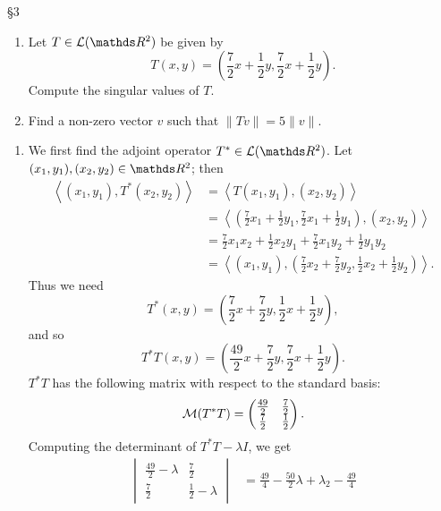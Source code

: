 \documentclass{homework}
\begin{document}
\begin{problem}{\S 3}
  \begin{enumerate}[label=(\alph*)]
    \item 
      Let $T\in \mc{L}(\R^2)$ be given by \[
        T(x,y)=(\frac{7}{2}x+\frac{1}{2}y, \frac{7}{2}x+\frac{1}{2}y)
      .\] Compute the singular values of $T$.
    \item Find a non-zero vector $v$ such that $\|Tv\|=5\|v\|$.
  \end{enumerate}
\end{problem}
\begin{solution}
  \begin{enumerate}[label=(\alph*)]
    \item 
  We first find the adjoint operator $T^*\in \mc{L}(\R^2)$. Let $(x_1,y_1),(x_2,y_2)\in \R^2$; then
  \begin{align*}
    \left<(x_1,y_1),T^*(x_2,y_2) \right> &= \left<T(x_1,y_1),(x_2,y_2) \right>  \\
                                         &= \left< (\frac{7}{2}x_1+\frac{1}{2}y_1,
                                         \frac{7}{2}x_1+\frac{1}{2}y_1), (x_2,y_2)\right>  \\
                                         &=
                                         \frac{7}{2}x_1x_2+\frac{1}{2}x_2y_1+\frac{7}{2}x_1y_2+\frac{1}{2}y_1y_2 \\
                                         &=
                                         \left<(x_1,y_1),(\frac{7}{2}x_2+\frac{7}{2}y_2,\frac{1}{2}x_2+\frac{1}{2}y_2) \right> 
  .\end{align*}
  Thus we need \[
    T^*(x,y)=(\frac{7}{2}x+\frac{7}{2}y,\frac{1}{2}x+\frac{1}{2}y)
  ,\] and so \[
    T^*T(x,y)=(\frac{49}{2}x+\frac{7}{2}y,\frac{7}{2}x+\frac{1}{2}y)
  .\] $T^*T$ has the following matrix with respect to the standard basis: \[
  \mathcal{M}(T^*T)=\begin{pmatrix} \frac{49}{2}&\frac{7}{2}\\\frac{7}{2}&\frac{1}{2} \end{pmatrix} 
  .\] Computing the determinant of $T^*T-\lambda I$, we get
  \begin{align*}
  \begin{vmatrix} \frac{49}{2}-\lambda&\frac{7}{2}\\\frac{7}{2}&\frac{1}{2}-\lambda \end{vmatrix}
                                      &=\frac{49}{4}-\frac{50}{2}\lambda+\lambda_2-\frac{49}{4}\\

\end{align*}
\end{enumerate}
\end{solution}
\end{document}
